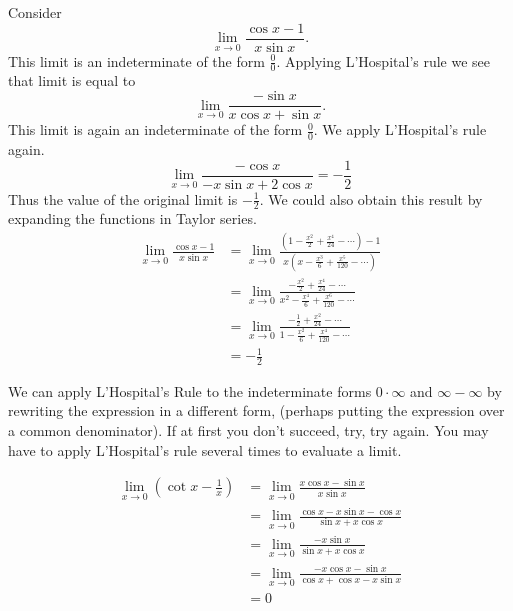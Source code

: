\begin{Example}
  Consider
  \[
  \lim_{x \to 0} \frac{\cos x - 1}{x \sin x}.
  \]
  This limit is an indeterminate of the form $\frac{0}{0}$.  Applying
  L'Hospital's rule we see that limit is equal to
  \[
  \lim_{x \to 0} \frac{-\sin x}{x \cos x + \sin x}.
  \]
  This limit is again an indeterminate of the form $\frac{0}{0}$.  We apply
  L'Hospital's rule again.
  \[
  \lim_{x \to 0} \frac{- \cos x}{ - x \sin x + 2 \cos x } = - \frac{1}{2}
  \]
  Thus the value of the original limit is $- \frac{1}{2}$.  We could also
  obtain this result by expanding the functions in Taylor series.
  \begin{align*}
    \lim_{x \to 0} \frac{\cos x - 1}{x \sin x}
    &= \lim_{x \to 0} \frac{\left( 1 - \frac{x^2}{2} + \frac{x^4}{24} 
        - \cdots \right) - 1 }{ x \left( x - \frac{x^3}{6} 
        + \frac{x^5}{120} - \cdots \right)} \\
    &= \lim_{x \to 0} \frac{- \frac{x^2}{2} + \frac{x^4}{24} - \cdots }
    { x^2 - \frac{x^4}{6} + \frac{x^6}{120} - \cdots } \\
    &= \lim_{x \to 0} \frac{- \frac{1}{2} + \frac{x^2}{24} - \cdots }
    { 1 - \frac{x^2}{6} + \frac{x^4}{120} - \cdots } \\
    &= - \frac{1}{2}
  \end{align*}
\end{Example}




We can apply L'Hospital's Rule to the indeterminate forms $0 \cdot \infty$
and $\infty - \infty$ by rewriting the expression in a different form, 
(perhaps putting the expression over a common denominator).  If at first
you don't succeed, try, try again.  You may have to apply L'Hospital's 
rule several times to evaluate a limit.


\begin{Example}
  \begin{align*}
    \lim_{x \to 0} \left( \cot x - \frac{1}{x} \right)
    &= \lim_{x \to 0} \frac{x \cos x - \sin x}{x \sin x} \\
    &= \lim_{x \to 0} \frac{\cos x - x \sin x - \cos x}
    {\sin x + x \cos x} \\
    &= \lim_{x \to 0} \frac{- x \sin x } {\sin x + x \cos x} \\
    &= \lim_{x \to 0} \frac{- x \cos x - \sin x } 
    {\cos x + \cos x - x \sin x } \\
    &= 0
  \end{align*}
\end{Example}


